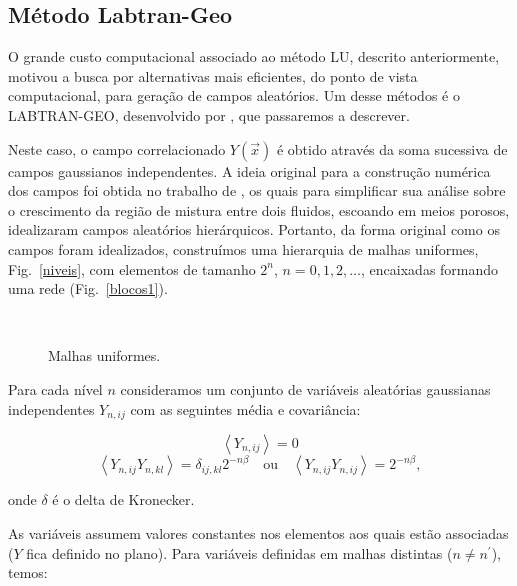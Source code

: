 \documentclass[12pt,a4paper,portuges]{article}
\newcommand{\LU}{{LU}}
\newcommand{\Y}{{Y}}
\begin{document}
\subsection{Método Labtran-Geo}

O grande custo computacional associado ao método \LU, descrito anteriormente, motivou a busca por
alternativas mais eficientes, do ponto de vista computacional, para geração de campos
aleatórios.
Um desse métodos é o LABTRAN-GEO, desenvolvido por \cite{mrborges08g}, que passaremos a
descrever.

Neste caso, o campo correlacionado $\Y(\vec{x})$ é obtido através da soma sucessiva de campos
gaussianos independentes.
A ideia original para a construção numérica dos campos foi obtida no trabalho de \cite{glimm91}, os
quais para simplificar sua análise sobre o crescimento da região de mistura entre dois fluidos,
escoando em meios porosos, idealizaram campos aleatórios hierárquicos. Portanto, da forma original
como os campos foram idealizados, construímos uma hierarquia de malhas uniformes, Fig.~\ref{niveis},
com elementos de tamanho $2^n$, $n=0, 1, 2, \dots$, encaixadas formando uma rede
(Fig.~\ref{blocos1}).

\begin{figure}[htbp]
\centering
\mbox{
}
\caption{\small Malhas uniformes.}
\label{va}
\end{figure}

Para cada nível $n$ consideramos um conjunto de variáveis aleatórias gaussianas independentes
${\Y}_{n,ij}$ com as seguintes média e covariância:

\[
	\left\langle {\Y}_{n,ij}\right\rangle = 0
\]
\[
	\left\langle {\Y}_{n,ij} {\Y}_{n,kl} \right\rangle = \delta_{ij,kl} 2^{-n
\beta}\quad\mbox{ou}\quad
	\left\langle {\Y}_{n,ij} {\Y}_{n,ij} \right\rangle =  2^{-n \beta},
\]

\noindent onde $\delta$ é o delta de Kronecker.

As variáveis assumem valores constantes nos elementos aos quais estão associadas (${\Y}$ fica
definido no plano). 
Para variáveis definidas em malhas distintas ($n \neq n^\prime$), temos:
\end{document}
